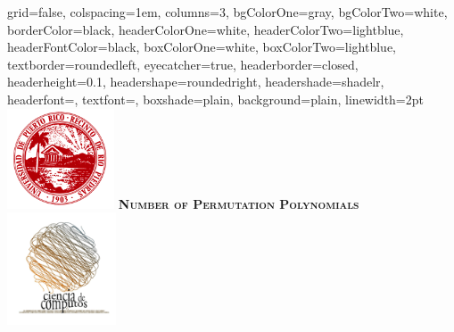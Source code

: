 \documentclass[landscape,final,paperwidth=48in,paperheight=36in]{baposter}
\begin{document}
\begin{poster}%
  {
  grid=false,
  colspacing=1em,
  columns=3,
  bgColorOne=gray,
  bgColorTwo=white,
  borderColor=black,
  headerColorOne=white,
  headerColorTwo=lightblue,
  headerFontColor=black,
  boxColorOne=white,
  boxColorTwo=lightblue,
  textborder=roundedleft,
  eyecatcher=true,
  headerborder=closed,
  headerheight=0.1\textheight,
  headershape=roundedright,
  headershade=shadelr,
  headerfont=\Large\textsc, %
  textfont=\large{\setlength{\parindent}{1.5em}},
  boxshade=plain,
  background=plain,
  linewidth=2pt
  }
  {\includegraphics[height=8em,keepaspectratio=true]{images/logo_uprrp}} 
  {\bf\textsc{Number of Permutation Polynomials}\vspace{0.1em}}
  {}
  {%
    \includegraphics[height=9em,keepaspectratio=true]{images/logo_ccom}
  }

    \newcommand{\colouredcircle}{%
      \tikz{\useasboundingbox (-0.2em,-0.32em) rectangle(0.2em,0.32em); \draw[draw=black,fill=lightblue,line width=0.03em] (0,0) circle(0.18em);}}


\end{poster}
\end{document}
